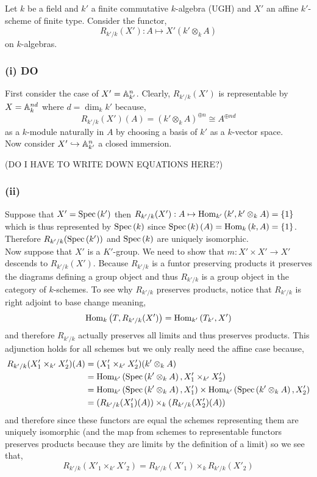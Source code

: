 \documentclass[12pt]{article}
\begin{document}
Let $k$ be a field and $k'$ a finite commutative $k$-algebra (UGH) and $X'$ an affine $k'$-scheme of finite type. Consider the functor,
\[ R_{k'/k}(X') : A \mapsto X'(k' \otimes_k A) \]
on $k$-algebras.

\subsubsection{(i) DO}

First consider the case of $X' = \mathbb{A}^n_{k'}$. Clearly, $R_{k'/k}(X')$ is representable by $X = \mathbb{A}^{n d}_k$ where $d = \dim_k k'$ because,
\[ R_{k'/k}(X')(A) = (k' \otimes_k A)^{\oplus n} \cong A^{\oplus n d} \]
as a $k$-module naturally in $A$ by choosing a basis of $k'$ as a $k$-vector space. 
\bigskip\\
Now consider $X' \hookrightarrow \mathbb{A}^n_{k'}$ a closed immersion. 

(DO I HAVE TO WRITE DOWN EQUATIONS HERE?)

\subsubsection{(ii)}

Suppose that $X' = \mathrm{Spec}\left( k' \right)$ then $R_{k'/k}(X') : A \mapsto \mathrm{Hom}_{k'} \left( k', k' \otimes_k A \right) = \{ 1 \}$ which is thus represented by $\mathrm{Spec}\left( k \right)$ since $\mathrm{Spec}\left( k \right)(A) = \mathrm{Hom}_{k} \left( k, A \right) = \{ 1 \}$. Therefore $R_{k'/k}(\mathrm{Spec}\left( k' \right))$ and $\mathrm{Spec}\left( k \right)$ are uniquely isomorphic. 
\bigskip\\
Now suppose that $X'$ is a $K'$-group. We need to show that $m : X' \times X' \to X'$ descends to $R_{k'/k}(X')$. Because $R_{k'/k}$ is a funtor preserving products it preserves the diagrams defining a group object and thus $R_{k'/k}$ is a group object in the category of $k$-schemes. To see why $R_{k'/k}$ preserves products, notice that $R_{k'/k}$ is right adjoint to base change meaning,
\[ \mathrm{Hom}_{k} \left( T, R_{k'/k}(X') \right) = \mathrm{Hom}_{k'} \left( T_{k'}, X' \right) \]
and therefore $R_{k'/k}$ actually preserves all limits and thus preserves products. This adjunction holds for all schemes but we only really need the affine case because,
\begin{align*}
R_{k'/k}(X'_1 \times_{k'} X'_2)(A) & = (X'_1 \times_{k'} X'_2)(k' \otimes_k A) 
\\
& = \mathrm{Hom}_{k'} \left( \mathrm{Spec}\left( k' \otimes_k A \right), X'_1 \times_{k'} X'_2 \right) 
\\
& = \mathrm{Hom}_{k'} \left( \mathrm{Spec}\left( k' \otimes_k A \right), X'_1 \right) \times \mathrm{Hom}_{k'} \left( \mathrm{Spec}\left( k' \otimes_k A \right), X'_2 \right) 
\\
& = (R_{k'/k}(X'_1)(A)) \times_{k} (R_{k'/k}(X'_2)(A)) 
\end{align*}
and therefore since these functors are equal the schemes representing them are uniquely isomorphic (and the map from schemes to representable functors preserves products because they are limits by the definition of a limit) so we see that,
\[ R_{k'/k}(X'_1 \times_{k'} X'_2) = R_{k'/k}(X'_1) \times_{k} R_{k'/k}(X'_2) \]
\end{document}
